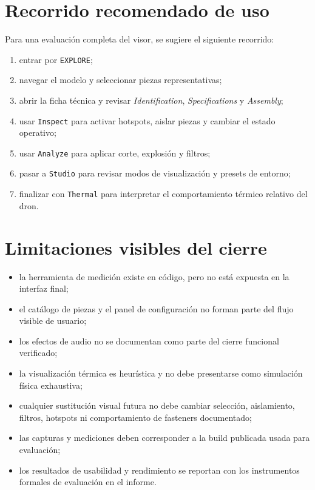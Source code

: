 \documentclass[12pt,letterpaper]{article}
\begin{document}
\section{Recorrido recomendado de uso}
Para una evaluación completa del visor, se sugiere el siguiente recorrido:
\begin{enumerate}
    \item entrar por \texttt{EXPLORE};
    \item navegar el modelo y seleccionar piezas representativas;
    \item abrir la ficha técnica y revisar \textit{Identification}, \textit{Specifications} y \textit{Assembly};
    \item usar \texttt{Inspect} para activar hotspots, aislar piezas y cambiar el estado operativo;
    \item usar \texttt{Analyze} para aplicar corte, explosión y filtros;
    \item pasar a \texttt{Studio} para revisar modos de visualización y presets de entorno;
    \item finalizar con \texttt{Thermal} para interpretar el comportamiento térmico relativo del dron.
\end{enumerate}

\section{Limitaciones visibles del cierre}
\begin{itemize}
    \item la herramienta de medición existe en código, pero no está expuesta en la interfaz final;
    \item el catálogo de piezas y el panel de configuración no forman parte del flujo visible de usuario;
    \item los efectos de audio no se documentan como parte del cierre funcional verificado;
    \item la visualización térmica es heurística y no debe presentarse como simulación física exhaustiva;
    \item cualquier sustitución visual futura no debe cambiar selección, aislamiento, filtros, hotspots ni comportamiento de fasteners documentado;
    \item las capturas y mediciones deben corresponder a la build publicada usada para evaluación;
    \item los resultados de usabilidad y rendimiento se reportan con los instrumentos formales de evaluación en el informe.
\end{itemize}
\end{document}
